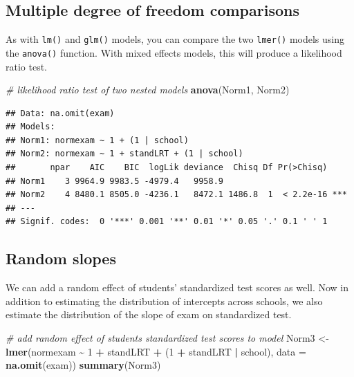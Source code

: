 \documentclass[
]{book}
\newenvironment{Shaded}{\begin{snugshade}}{\end{snugshade}}
\newcommand{\CommentTok}[1]{\textcolor[rgb]{0.56,0.35,0.01}{\textit{#1}}}
\newcommand{\DataTypeTok}[1]{\textcolor[rgb]{0.13,0.29,0.53}{#1}}
\newcommand{\DecValTok}[1]{\textcolor[rgb]{0.00,0.00,0.81}{#1}}
\newcommand{\KeywordTok}[1]{\textcolor[rgb]{0.13,0.29,0.53}{\textbf{#1}}}
\newcommand{\NormalTok}[1]{#1}
\newcommand{\OperatorTok}[1]{\textcolor[rgb]{0.81,0.36,0.00}{\textbf{#1}}}
\newcommand{\StringTok}[1]{\textcolor[rgb]{0.31,0.60,0.02}{#1}}
\begin{document}
\hypertarget{multiple-degree-of-freedom-comparisons}{%
\subsection{Multiple degree of freedom comparisons}\label{multiple-degree-of-freedom-comparisons}}

As with \texttt{lm()} and \texttt{glm()} models, you can compare the two \texttt{lmer()} models using the \texttt{anova()} function. With mixed effects models, this will produce a likelihood ratio test.

\begin{Shaded}
\begin{Highlighting}[]
  \CommentTok{\# likelihood ratio test of two nested models}
  \KeywordTok{anova}\NormalTok{(Norm1, Norm2)}
\end{Highlighting}
\end{Shaded}

\begin{verbatim}
## Data: na.omit(exam)
## Models:
## Norm1: normexam ~ 1 + (1 | school)
## Norm2: normexam ~ 1 + standLRT + (1 | school)
##       npar    AIC    BIC  logLik deviance  Chisq Df Pr(>Chisq)    
## Norm1    3 9964.9 9983.5 -4979.4   9958.9                         
## Norm2    4 8480.1 8505.0 -4236.1   8472.1 1486.8  1  < 2.2e-16 ***
## ---
## Signif. codes:  0 '***' 0.001 '**' 0.01 '*' 0.05 '.' 0.1 ' ' 1
\end{verbatim}

\hypertarget{random-slopes}{%
\subsection{Random slopes}\label{random-slopes}}

We can add a random effect of students' standardized test scores as well. Now in addition to estimating the distribution of intercepts across schools, we also estimate the distribution of the slope of exam on standardized test.

\begin{Shaded}
\begin{Highlighting}[]
  \CommentTok{\# add random effect of students\textquotesingle{} standardized test scores to model}
\NormalTok{  Norm3 \textless{}{-}}\StringTok{ }\KeywordTok{lmer}\NormalTok{(normexam }\OperatorTok{\textasciitilde{}}\StringTok{ }\DecValTok{1} \OperatorTok{+}\StringTok{ }\NormalTok{standLRT }\OperatorTok{+}\StringTok{ }\NormalTok{(}\DecValTok{1} \OperatorTok{+}\StringTok{ }\NormalTok{standLRT }\OperatorTok{|}\StringTok{ }\NormalTok{school), }
                \DataTypeTok{data =} \KeywordTok{na.omit}\NormalTok{(exam)) }
  \KeywordTok{summary}\NormalTok{(Norm3) }
\end{Highlighting}
\end{Shaded}
\end{document}
